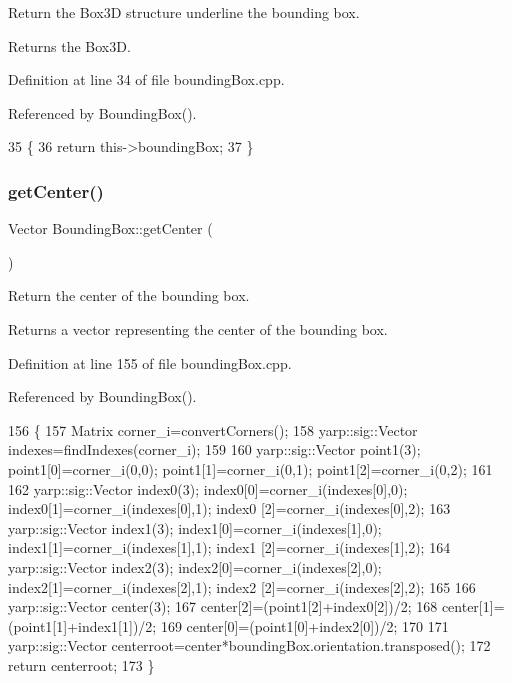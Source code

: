 Return the Box3D structure underline the bounding box. 

\begin{DoxyReturn}{Returns}
the Box3D. 
\end{DoxyReturn}


Definition at line 34 of file bounding\+Box.\+cpp.



Referenced by Bounding\+Box().


\begin{DoxyCode}
35 \{
36     \textcolor{keywordflow}{return} this->boundingBox;
37 \}
\end{DoxyCode}
\label{classiCub_1_1data3D_1_1BoundingBox_af16a8f9810623cfa43b0efcee20ebc44} 
\subsubsection{\texorpdfstring{get\+Center()}{getCenter()}}
{\footnotesize\ttfamily Vector Bounding\+Box\+::get\+Center (\begin{DoxyParamCaption}{ }\end{DoxyParamCaption})}



Return the center of the bounding box. 

\begin{DoxyReturn}{Returns}
a vector representing the center of the bounding box. 
\end{DoxyReturn}


Definition at line 155 of file bounding\+Box.\+cpp.



Referenced by Bounding\+Box().


\begin{DoxyCode}
156 \{
157     Matrix corner\_i=convertCorners();
158     yarp::sig::Vector indexes=findIndexes(corner\_i);
159 
160     yarp::sig::Vector point1(3); point1[0]=corner\_i(0,0); point1[1]=corner\_i(0,1); point1[2]=corner\_i(0,2);
161     
162     yarp::sig::Vector index0(3); index0[0]=corner\_i(indexes[0],0); index0[1]=corner\_i(indexes[0],1); index0
      [2]=corner\_i(indexes[0],2);
163     yarp::sig::Vector index1(3); index1[0]=corner\_i(indexes[1],0); index1[1]=corner\_i(indexes[1],1); index1
      [2]=corner\_i(indexes[1],2);
164     yarp::sig::Vector index2(3); index2[0]=corner\_i(indexes[2],0); index2[1]=corner\_i(indexes[2],1); index2
      [2]=corner\_i(indexes[2],2);
165 
166     yarp::sig::Vector center(3);
167     center[2]=(point1[2]+index0[2])/2;
168     center[1]=(point1[1]+index1[1])/2;
169     center[0]=(point1[0]+index2[0])/2;
170 
171     yarp::sig::Vector centerroot=center*boundingBox.orientation.transposed();
172     \textcolor{keywordflow}{return} centerroot;
173 \}
\end{DoxyCode}
\label{classiCub_1_1data3D_1_1BoundingBox_a08949c30ec7ee296981c11ad5ff4714e} 
